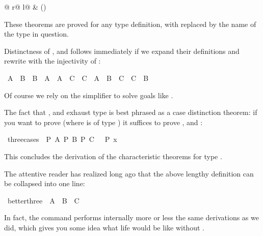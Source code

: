 \begin{isabellebody}
\begin{isamarkuptext}
\begin{center}
\begin{tabular}{@ {}r@ {\qquad}l@ {}}
 & () \\
\end{tabular}
\end{center}
These theorems are proved for any type definition, with 
replaced by the name of the type in question.

Distinctness of ,  and  follows immediately
if we expand their definitions and rewrite with the injectivity
of :%
\end{isamarkuptext}%
\isamarkuptrue%
\ {\isachardoublequote}A\ {\isasymnoteq}\ B\ {\isasymand}\ B\ {\isasymnoteq}\ A\ {\isasymand}\ A\ {\isasymnoteq}\ C\ {\isasymand}\ C\ {\isasymnoteq}\ A\ {\isasymand}\ B\ {\isasymnoteq}\ C\ {\isasymand}\ C\ {\isasymnoteq}\ B{\isachardoublequote}\isanewline
\isamarkupfalse%
\isamarkupfalse%
%
\begin{isamarkuptext}%
\noindent
Of course we rely on the simplifier to solve goals like .

The fact that ,  and  exhaust type  is
best phrased as a case distinction theorem: if you want to prove 
(where  is of type ) it suffices to prove ,
 and :%
\end{isamarkuptext}%
\isamarkuptrue%
\ three{\isacharunderscore}cases{\isacharcolon}\ {\isachardoublequote}{\isasymlbrakk}\ P\ A{\isacharsemicolon}\ P\ B{\isacharsemicolon}\ P\ C\ {\isasymrbrakk}\ {\isasymLongrightarrow}\ P\ x{\isachardoublequote}\isamarkupfalse%
\isamarkuptrue%
\isamarkupfalse%
\isamarkuptrue%
\isamarkupfalse%
\isamarkupfalse%
%
\begin{isamarkuptext}%
\noindent
This concludes the derivation of the characteristic theorems for
type .

The attentive reader has realized long ago that the
above lengthy definition can be collapsed into one line:%
\end{isamarkuptext}%
\isamarkuptrue%
\ better{\isacharunderscore}three\ {\isacharequal}\ A\ {\isacharbar}\ B\ {\isacharbar}\ C\isamarkupfalse%
%
\begin{isamarkuptext}%
\noindent
In fact, the  command performs internally more or less
the same derivations as we did, which gives you some idea what life would be
like without .


\end{isamarkuptext}
\end{isabellebody}
